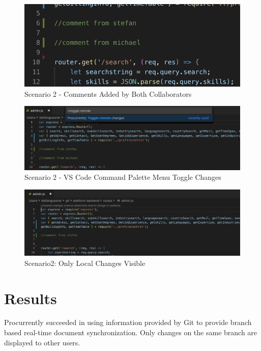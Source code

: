 \begin{figure}
    \centering
    \includegraphics[width=1\textwidth]{figures/screenshots/scenarios/2comments.png}
    \caption{Scenario 2 - Comments Added by Both Collaborators}
    \label{fig:2comments}
\end{figure}
\begin{figure}
    \centering
    \includegraphics[width=1\linewidth]{figures/screenshots/scenarios/2togglechanges.png}
    \caption{Scenario 2 - VS Code Command Palette Menu Toggle Changes}
    \label{fig:2togglechanges}
\end{figure}

\begin{figure}[hb]
    \centering
    \includegraphics[width=1\textwidth]{figures/screenshots/scenarios/2onlylocalchanges.png}
	\caption{Scenario2: Only Local Changes Visible}
    \label{fig:2onlylocalchanges}
\end{figure}

\section{Results}
Procurrently succeeded in using information provided by Git to provide branch based real-time document synchronization. Only changes on the same branch are displayed to other users.

